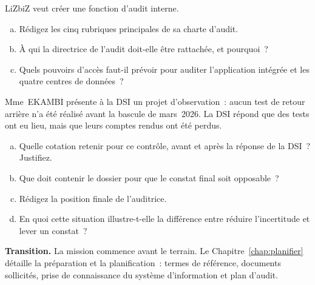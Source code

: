 \begin{boxexo}[title={\ding{45}\quad Exercice~5.2. La charte d'audit de LiZbiZ \niveaumoyen}]
LiZbiZ veut créer une fonction d'audit interne.
\begin{enumerate}[(a)]
    \item Rédigez les cinq rubriques principales de sa charte d'audit.
    \item À qui la directrice de l'audit doit-elle être rattachée, et
          pourquoi~?
    \item Quels pouvoirs d'accès faut-il prévoir pour auditer l'application
          intégrée et les quatre centres de données~?
\end{enumerate}
\end{boxexo}

\begin{boxexo}[title={\ding{45}\quad Exercice~5.3. Le contradictoire à la BANQUE SANAGA \niveauexpert}]
Mme~EKAMBI présente à la DSI un projet d'observation~: aucun test de retour
arrière n'a été réalisé avant la bascule de mars~2026. La DSI répond que des
tests ont eu lieu, mais que leurs comptes rendus ont été perdus.
\begin{enumerate}[(a)]
    \item Quelle cotation retenir pour ce contrôle, avant et après la
          réponse de la DSI~? Justifiez.
    \item Que doit contenir le dossier pour que le constat final soit
          opposable~?
    \item Rédigez la position finale de l'auditrice.
    \item En quoi cette situation illustre-t-elle la différence entre réduire
          l'incertitude et lever un constat~?
\end{enumerate}
\end{boxexo}

\bigskip

\begin{boxinfo}
\textbf{Transition.} La mission commence avant le terrain. Le
Chapitre~\ref{chap:planifier} détaille la préparation et la planification~:
termes de référence, documents sollicités, prise de connaissance du système
d'information et plan d'audit.
\end{boxinfo}
